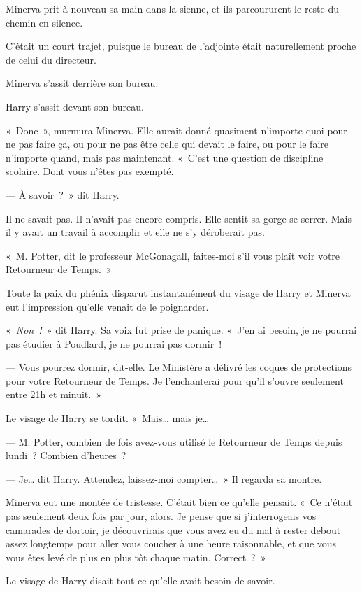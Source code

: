 Minerva prit à nouveau sa main dans la sienne, et ils parcoururent le reste du chemin en silence.

C'était un court trajet, puisque le bureau de l'adjointe était naturellement proche de celui du directeur.

Minerva s'assit derrière son bureau.

Harry s'assit devant son bureau.

«~Donc~», murmura Minerva. Elle aurait donné quasiment n'importe quoi pour ne pas faire ça, ou pour ne pas être celle qui devait le faire, ou pour le faire n'importe quand, mais pas maintenant. «~C'est une question de discipline scolaire. Dont vous n'êtes pas exempté.

--- À savoir~?~» dit Harry.

Il ne savait pas. Il n'avait pas encore compris. Elle sentit sa gorge se serrer. Mais il y avait un travail à accomplir et elle ne s'y déroberait pas.

«~M. Potter, dit le professeur McGonagall, faites-moi s'il vous plaît voir votre Retourneur de Temps.~»

Toute la paix du phénix disparut instantanément du visage de Harry et Minerva eut l'impression qu'elle venait de le poignarder.

«~\emph{Non~!}~» dit Harry. Sa voix fut prise de panique. «~J'en ai besoin, je ne pourrai pas étudier à Poudlard, je ne pourrai pas dormir~!

--- Vous pourrez dormir, dit-elle. Le Ministère a délivré les coques de protections pour votre Retourneur de Temps. Je l'enchanterai pour qu'il s'ouvre seulement entre 21h et minuit.~»

Le visage de Harry se tordit. «~Mais… mais je…

--- M. Potter, combien de fois avez-vous utilisé le Retourneur de Temps depuis lundi~? Combien d'heures~?

--- Je… dit Harry. Attendez, laissez-moi compter…~» Il regarda sa montre.

Minerva eut une montée de tristesse. C'était bien ce qu'elle pensait. «~Ce n'était pas seulement deux fois par jour, alors. Je pense que si j'interrogeais vos camarades de dortoir, je découvrirais que vous avez eu du mal à rester debout assez longtemps pour aller vous coucher à une heure raisonnable, et que vous vous êtes levé de plus en plus tôt chaque matin. Correct~?~»

Le visage de Harry disait tout ce qu'elle avait besoin de savoir.

